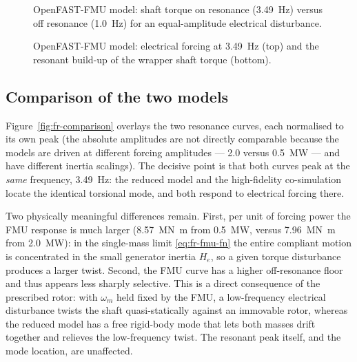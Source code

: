 \begin{figure}[t]
  \centering
  \caption{OpenFAST-FMU model: shaft torque on resonance (\SI{3.49}{\hertz})
  versus off resonance (\SI{1.0}{\hertz}) for an equal-amplitude electrical
  disturbance.}
  \label{fig:fr-onoff-fmu}
\end{figure}

\begin{figure}[t]
  \centering
  \caption{OpenFAST-FMU model: electrical forcing at \SI{3.49}{\hertz} (top) and
  the resonant build-up of the wrapper shaft torque (bottom).}
  \label{fig:fr-buildup-fmu}
\end{figure}

\subsection{Comparison of the two models}
\label{subsec:fr-comparison}

Figure~\ref{fig:fr-comparison} overlays the two resonance curves, each
normalised to its own peak (the absolute amplitudes are not directly comparable
because the models are driven at different forcing amplitudes ---
\SI{2.0}{} versus \SI{0.5}{\mega\watt} --- and have different inertia scalings).
The decisive point is that both curves peak at the \emph{same} frequency,
\SI{3.49}{\hertz}: the reduced model and the high-fidelity co-simulation locate
the identical torsional mode, and both respond to electrical forcing there.

Two physically meaningful differences remain. First, per unit of forcing power
the FMU response is much larger (\SI{8.57}{\mega\newton\metre} from
\SI{0.5}{\mega\watt}, versus \SI{7.96}{\mega\newton\metre} from
\SI{2.0}{\mega\watt}): in the single-mass limit \eqref{eq:fr-fmu-fn} the entire
compliant motion is concentrated in the small generator inertia $H_e$, so a
given torque disturbance produces a larger twist. Second, the FMU curve has a
higher off-resonance floor and thus appears less sharply selective. This is a
direct consequence of the prescribed rotor: with $\omega_m$ held fixed by the
FMU, a low-frequency electrical disturbance twists the shaft quasi-statically
against an immovable rotor, whereas the reduced model has a free rigid-body mode
that lets both masses drift together and relieves the low-frequency twist. The
resonant peak itself, and the mode location, are unaffected.

